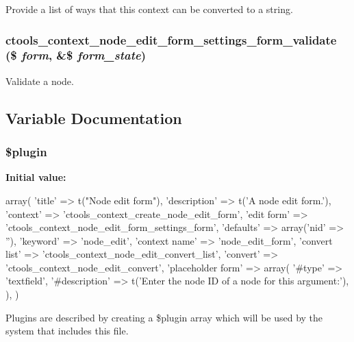 \label{node__edit__form_8inc_a0dbe2d1dee992d9ba97df1be41bbaa11}
Provide a list of ways that this context can be converted to a string. \hypertarget{node__edit__form_8inc_a5985cb430ed6cbdbffb2bcd943977c27}{
\subsubsection[{ctools\_\-context\_\-node\_\-edit\_\-form\_\-settings\_\-form\_\-validate}]{\setlength{\rightskip}{0pt plus 5cm}ctools\_\-context\_\-node\_\-edit\_\-form\_\-settings\_\-form\_\-validate (\$ {\em form}, \/  \&\$ {\em form\_\-state})}}
\label{node__edit__form_8inc_a5985cb430ed6cbdbffb2bcd943977c27}
Validate a node. 

\subsection{Variable Documentation}
\hypertarget{node__edit__form_8inc_ada8a7130088351710bb02ed622d6bf65}{
\subsubsection[{\$plugin}]{\setlength{\rightskip}{0pt plus 5cm}\$plugin}}
\label{node__edit__form_8inc_ada8a7130088351710bb02ed622d6bf65}
{\bfseries Initial value:}
\begin{DoxyCode}
 array(
  'title' => t("Node edit form"),
  'description' => t('A node edit form.'),
  'context' => 'ctools_context_create_node_edit_form',
  'edit form' => 'ctools_context_node_edit_form_settings_form',
  'defaults' => array('nid' => ''),
  'keyword' => 'node_edit',
  'context name' => 'node_edit_form',
  'convert list' => 'ctools_context_node_edit_convert_list',
  'convert' => 'ctools_context_node_edit_convert',
  'placeholder form' => array(
    '#type' => 'textfield',
    '#description' => t('Enter the node ID of a node for this argument:'),
  ),
)
\end{DoxyCode}
Plugins are described by creating a \$plugin array which will be used by the system that includes this file. 
